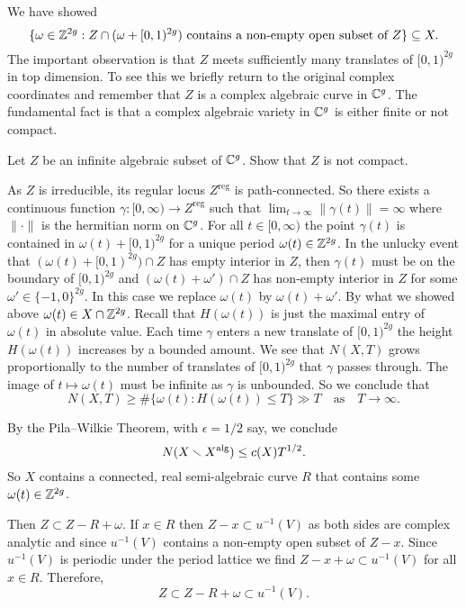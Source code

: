 We have showed
$$\{\omega\in{\mathbb{Z}}^{2g} :    Z\cap (\omega+[0,1)^{2g})\text{ contains a non-empty open subset of $Z$}\} \subseteq X.$$ The important observation is that
$Z$ meets sufficiently many translates of $[0,1)^{2g}$ in top dimension. To see
this 
we briefly  return to the original complex
coordinates and remember that $Z$ is a complex
algebraic curve in ${\mathbb{C}}^g$. The fundamental fact is that a complex
algebraic variety in ${\mathbb{C}}^g$ is either finite or not compact.

\begin{exercise}
  Let $Z$ be an infinite algebraic subset of ${\mathbb{C}}^g$. Show that $Z$ is
  not compact. 
\end{exercise}

As $Z$ is irreducible, its regular locus $Z^{\mathrm{reg}}$ is
path-connected. 
So there exists  a continuous function $\gamma : [0,\infty)\rightarrow
Z^{\mathrm{reg}}$ such that $\lim_{t\rightarrow\infty} \|\gamma(t)\| = \infty$
where $\|\cdot\|$ is the hermitian norm on ${\mathbb{C}}^g$. 
For all $t\in [0,\infty)$ the point $\gamma(t)$ is contained in
$\omega(t)+[0,1)^{2g}$ for a unique period $\omega(t)\in{\mathbb{Z}}^{2g}$.
In the unlucky event
that $(\omega(t)+[0,1)^{2g}) \cap Z$ has empty interior
in $Z$, then $\gamma(t)$ must be on the boundary of $[0,1)^{2g}$ and
$(\omega(t)+\omega')\cap Z$ has non-empty interior in $Z$
for some $\omega' \in \{-1,0\}^{2g}$. In this case we replace
$\omega(t)$ by $\omega(t)+\omega'$. 
By
what we showed above $\omega(t)\in X\cap{\mathbb{Z}}^{2g}$.
Recall that $H(\omega(t))$ is
just the maximal entry of $\omega(t)$ in absolute value.
Each time
$\gamma$ enters a new translate of $[0,1)^{2g}$ the height
$H(\omega(t))$ increases by a bounded amount.
We see that $N(X,T)$ grows proportionally to the number of translates of
$[0,1)^{2g}$ that $\gamma$ passes through. The image of $t\mapsto \omega(t)$ must be infinite as $\gamma$ is unbounded. 
So we conclude that
\begin{equation*}
  N(X,T) \ge \# \{\omega(t) : H(\omega(t)) \le T\}  \gg T\quad\text{as}\quad T\rightarrow\infty.
\end{equation*}

By the Pila--Wilkie Theorem, with $\epsilon=1/2$ say, we conclude
$$
N(X\smallsetminus X^{\mathrm{alg}})  \le c(X) T^{1/2}.
$$
So $X$ contains a connected, real semi-algebraic curve $R$ that
 contains some $\omega(t)\in{\mathbb{Z}}^{2g}$. 


Then $Z\subset Z-R+\omega$. If $x\in R$ then
$Z-x\subset u^{-1}(V)$ as both sides are complex analytic and since
$u^{-1}(V)$ contains a non-empty open subset of $Z-x$. 
Since $u^{-1}(V)$ is periodic under the period lattice we find
$Z-x+\omega\subset u^{-1}(V)$ for all $x\in R$. Therefore,
\begin{equation*}
  Z\subset Z-R+\omega \subset u^{-1}(V).
\end{equation*}

